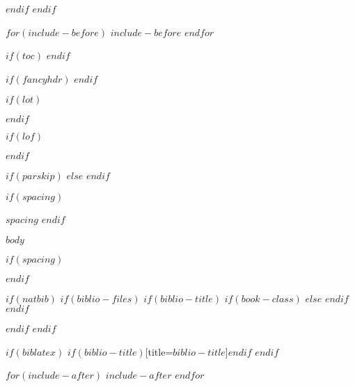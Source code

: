 \documentclass[$if(fontsize)$$fontsize$,$endif$$if(lang)$$lang$,$endif$$if(papersize)$$papersize$,$endif$$for(classoption)$$classoption$$sep$,$endfor$]{$documentclass$}
\begin{document}
$endif$
$endif$

$for(include-before)$
$include-before$
$endfor$

$if(toc)$
\tableofcontents
\clearpage
$endif$

$if(fancyhdr)$
\pagestyle{mainstyle}
$endif$

$if(lot)$
\listoftables
\clearpage
$endif$

$if(lof)$
\listoffigures
\clearpage
$endif$

$if(parskip)$
\setlength{\parskip}{$parskip$}
$else$
\setlength{\parskip}{11pt}
$endif$

$if(spacing)$
\begin{spacing}{$spacing$}
$endif$

$body$

$if(spacing)$
\end{spacing}
$endif$

$if(natbib)$
$if(biblio-files)$
$if(biblio-title)$
$if(book-class)$
\renewcommand\bibname{$biblio-title$}
$else$
\renewcommand\refname{$biblio-title$}
$endif$
$endif$

$endif$
$endif$

$if(biblatex)$
\printbibliography$if(biblio-title)$[title=$biblio-title$]$endif$
$endif$

$for(include-after)$
$include-after$
$endfor$
\end{document}
